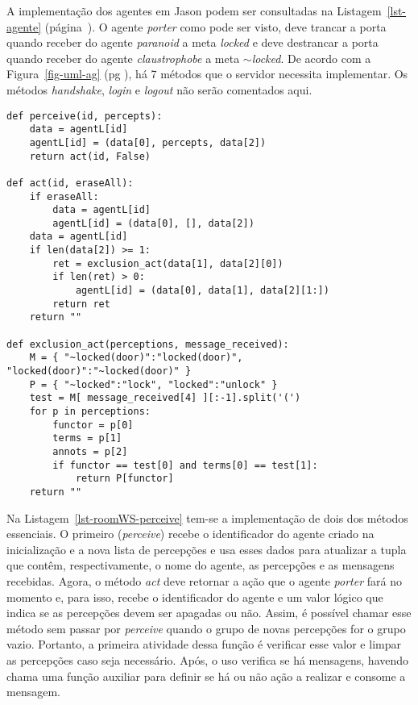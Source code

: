 A implementação dos agentes em Jason podem ser consultadas na
Listagem~\ref{lst-agente} (página~\pageref{lst-agente}). O agente \emph{porter}
como pode ser visto, deve trancar a porta quando receber do agente
\emph{paranoid} a meta \emph{locked} e deve destrancar a porta quando receber
do agente \emph{claustrophobe} a meta $\sim$\emph{locked}. De acordo com a
Figura~\ref{fig-uml-ag} (pg \pageref{fig-uml-ag}), há 7 métodos que o servidor
necessita implementar. Os métodos \emph{handshake}, \emph{login} e
\emph{logout} não serão comentados aqui.

\lstset{linewidth=130mm}
\begin{center}
    \begin{minipage}{140mm}
	\begin{lstlisting}[frame=trbl, caption=Método de percepção e ação do agente \emph{porter}., label=lst-roomWS-perceive]
def perceive(id, percepts):
	data = agentL[id]
	agentL[id] = (data[0], percepts, data[2])
	return act(id, False)

def act(id, eraseAll):
	if eraseAll:
		data = agentL[id]
		agentL[id] = (data[0], [], data[2])
	data = agentL[id]
	if len(data[2]) >= 1:
		ret = exclusion_act(data[1], data[2][0])
		if len(ret) > 0:
			agentL[id] = (data[0], data[1], data[2][1:])
		return ret
	return ""

def exclusion_act(perceptions, message_received):
	M = { "~locked(door)":"locked(door)", "locked(door)":"~locked(door)" }
	P = { "~locked":"lock", "locked":"unlock" }
	test = M[ message_received[4] ][:-1].split('(')
	for p in perceptions:
		functor = p[0]
		terms = p[1]
		annots = p[2]
		if functor == test[0] and terms[0] == test[1]:
			return P[functor]
	return ""
	\end{lstlisting}
    \end{minipage}
\end{center}

Na Listagem~\ref{lst-roomWS-perceive} tem-se a implementação de dois dos
métodos essenciais. O primeiro (\emph{perceive}) recebe o identificador do
agente criado na inicialização e a nova lista de percepções e usa esses
dados para atualizar a tupla que contêm, respectivamente, o nome do agente, as
percepções e as mensagens recebidas. Agora, o método \emph{act} deve retornar
a ação que o agente \emph{porter} fará no momento e, para isso, recebe o
identificador do agente e um valor lógico que indica se as percepções devem
ser apagadas ou não. Assim, é possível chamar esse método sem passar por
\emph{perceive} quando o grupo de novas percepções for o grupo vazio. Portanto, a
primeira atividade dessa função é verificar esse valor e limpar as percepções
caso seja necessário. Após, o uso verifica se há mensagens, havendo chama
uma função auxiliar para definir se há ou não ação a realizar e consome a
mensagem.

